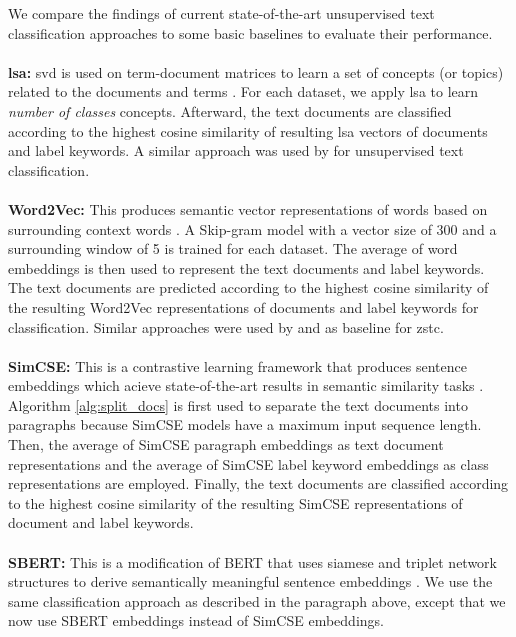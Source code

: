 \documentclass[sigconf]{acmart}
\begin{document}
We compare the findings of current state-of-the-art unsupervised text classification approaches to some basic baselines to evaluate their performance. \\ \\
\textbf{\ac{lsa}:} \ac{svd} is used on term-document matrices to learn a set of concepts (or topics) related to the documents and terms \cite{Deerwester1990IndexingBL}. For each dataset, we apply \ac{lsa} to learn  \textit{number of classes} concepts. Afterward, the text documents are classified according to the highest cosine similarity of resulting \ac{lsa} vectors of documents and label keywords. A similar approach was used by \citet{haj-yahia-etal-2019-towards} for unsupervised text classification.\\ \\
\textbf{Word2Vec:} This produces semantic vector representations of words based on surrounding context words \cite{NIPS2013_9aa42b31}. A Skip-gram model with a vector size of 300 and a surrounding window of 5 is trained for each dataset. The average of word embeddings is then used to represent the text documents and label keywords. The text documents are predicted according to the highest cosine similarity of the resulting Word2Vec representations of documents and label keywords for classification. Similar approaches were used by \citet{yin-etal-2019-benchmarking} and \citet{ye-etal-2020-zero} as baseline for \ac{zstc}.\\ \\
\textbf{SimCSE:} This is a contrastive learning framework that produces sentence embeddings which acieve state-of-the-art results in semantic similarity tasks \cite{gao-etal-2021-simcse}. Algorithm \ref{alg:split_docs} is first used to separate the text documents into paragraphs because SimCSE models have a maximum input sequence length. Then, the average of SimCSE paragraph embeddings as text document representations and the average of SimCSE label keyword embeddings as class representations are employed. Finally, the text documents are classified according to the highest cosine similarity of the resulting SimCSE representations of document and label keywords. \\ \\ 
\textbf{SBERT:} This is a modification of BERT \cite{devlin-etal-2019-bert} that uses siamese and triplet network structures to derive semantically meaningful sentence embeddings \cite{reimers-gurevych-2019-sentence}. We use the same classification approach as described in the paragraph above, except that we now use SBERT embeddings instead of SimCSE embeddings. 
\end{document}
